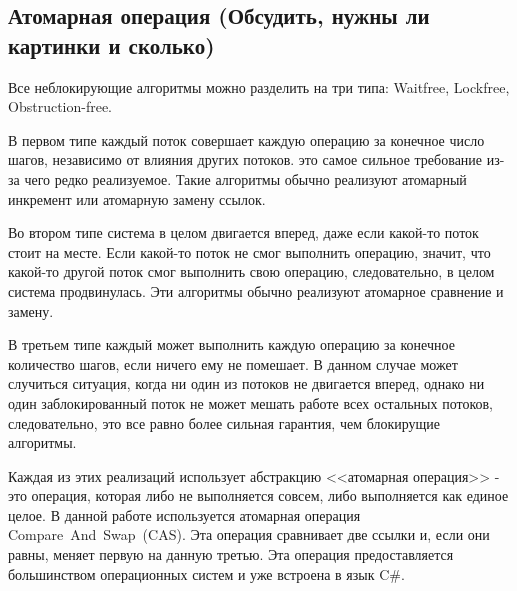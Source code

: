 \documentclass[12pt]{article}
\begin{document}
{			\subsection{Атомарная операция (Обсудить, нужны ли картинки и сколько)}
				\par Все неблокирующие алгоритмы можно разделить на три типа: Waitfree, Lockfree, Obstruction-free.
				\par В первом типе каждый поток совершает каждую операцию за конечное число шагов, независимо от влияния других потоков. это самое сильное требование из-за чего редко реализуемое. Такие алгоритмы обычно реализуют атомарный инкремент или атомарную замену ссылок.
				\par Во втором типе система в целом двигается вперед, даже если какой-то поток стоит на месте. Если какой-то поток не смог выполнить операцию, значит, что какой-то другой поток смог выполнить свою операцию, следовательно, в целом система продвинулась. Эти алгоритмы обычно реализуют атомарное сравнение и замену.
				\par В третьем типе каждый может выполнить каждую операцию за конечное количество шагов, если ничего ему не помешает. В данном случае может случиться ситуация, когда ни один из потоков не двигается вперед, однако ни один заблокированный поток не может мешать работе всех остальных потоков, следовательно, это все равно более сильная гарантия, чем блокирущие алгоритмы.
				\par Каждая из этих реализаций использует абстракцию <<атомарная операция>> - это операция, которая либо не выполняется совсем, либо выполняется как единое целое. В данной работе используется атомарная операция Compare~And~Swap~(CAS). Эта операция сравнивает две ссылки и, если они равны, меняет первую на данную третью. Эта операция предоставляется большинством операционных систем и уже встроена в язык C\#.
}
\end{document}
